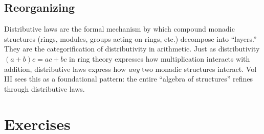 \subsection{Reorganizing}

\begin{remark}
Distributive laws are the formal mechanism by which compound monadic
structures (rings, modules, groups acting on rings, etc.) decompose into
``layers.'' They are the categorification of distributivity in arithmetic.
Just as distributivity $(a + b)c = ac + bc$ in ring theory expresses
how multiplication interacts with addition, distributive laws express how
\emph{any} two monadic structures interact. Vol III sees this as a
foundational pattern: the entire ``algebra of structures'' refines through
distributive laws.
\end{remark}


\section{Exercises}
\label{sec:dist-exercises}

